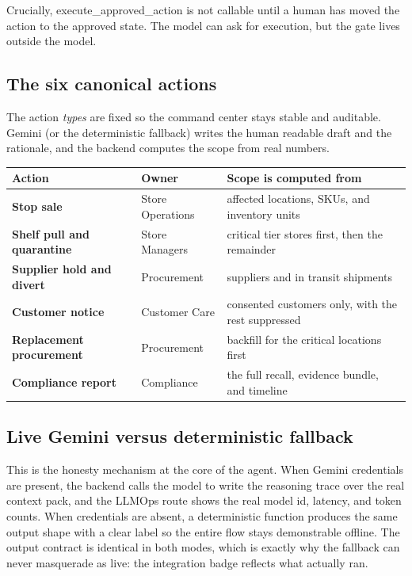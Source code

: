 \documentclass[11pt]{article}
\newcommand{\code}[1]{{\ttfamily\small #1}}
\begin{document}
Crucially, \code{execute\_approved\_action} is not callable until a human has moved the action to
the approved state. The model can ask for execution, but the gate lives outside the model.

\subsection{The six canonical actions}

The action \emph{types} are fixed so the command center stays stable and auditable. Gemini (or the
deterministic fallback) writes the human readable draft and the rationale, and the backend computes
the scope from real numbers.

\begin{center}
\renewcommand{\arraystretch}{1.3}
\begin{tabularx}{\textwidth}{@{}>{\bfseries}l l X@{}}
\toprule
Action & Owner & Scope is computed from \\
\midrule
Stop sale & Store Operations & affected locations, SKUs, and inventory units \\
Shelf pull and quarantine & Store Managers & critical tier stores first, then the remainder \\
Supplier hold and divert & Procurement & suppliers and in transit shipments \\
Customer notice & Customer Care & consented customers only, with the rest suppressed \\
Replacement procurement & Procurement & backfill for the critical locations first \\
Compliance report & Compliance & the full recall, evidence bundle, and timeline \\
\bottomrule
\end{tabularx}
\end{center}

\subsection{Live Gemini versus deterministic fallback}

This is the honesty mechanism at the core of the agent. When Gemini credentials are present, the
backend calls the model to write the reasoning trace over the real context pack, and the LLMOps
route shows the real model id, latency, and token counts. When credentials are absent, a
deterministic function produces the same output shape with a clear label so the entire flow stays
demonstrable offline. The output contract is identical in both modes, which is exactly why the
fallback can never masquerade as live: the integration badge reflects what actually ran.
\end{document}
